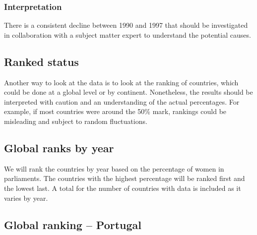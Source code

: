 \documentclass[a4paper,9pt,twocolumn,twoside,printwatermark=false]{pinp}
\begin{document}
\hypertarget{interpretation-2}{%
\subsubsection{Interpretation}\label{interpretation-2}}

There is a consistent decline between 1990 and 1997 that should be
investigated in collaboration with a subject matter expert to understand
the potential causes.

\hypertarget{ranked-status}{%
\subsection{Ranked status}\label{ranked-status}}

Another way to look at the data is to look at the ranking of countries,
which could be done at a global level or by continent. Nonetheless, the
results should be interpreted with caution and an understanding of the
actual percentages. For example, if most countries were around the 50\%
mark, rankings could be misleading and subject to random fluctuations.

\hypertarget{global-ranks-by-year}{%
\subsection{Global ranks by year}\label{global-ranks-by-year}}

We will rank the countries by year based on the percentage of women in
parliaments. The countries with the highest percentage will be ranked
first and the lowest last. A total for the number of countries with data
is included as it varies by year.

\begin{Shaded}
\end{Shaded}

\hypertarget{global-ranking-portugal}{%
\subsection{Global ranking -- Portugal}\label{global-ranking-portugal}}
\end{document}
